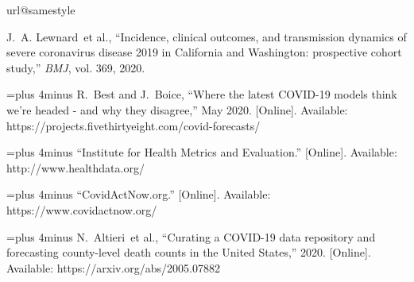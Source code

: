 











% 
% 

\begin{thebibliography}{10}
\providecommand{\url}[1]{#1}
\csname url@samestyle\endcsname
\providecommand{\newblock}{\relax}
\providecommand{\bibinfo}[2]{#2}
\providecommand{\BIBentrySTDinterwordspacing}{\spaceskip=0pt\relax}
\providecommand{\BIBentryALTinterwordstretchfactor}{4}
\providecommand{\BIBentryALTinterwordspacing}{\spaceskip=\fontdimen2\font plus
\BIBentryALTinterwordstretchfactor\fontdimen3\font minus
  \fontdimen4\font\relax}
\providecommand{\BIBforeignlanguage}[2]{{%
\expandafter\ifx\csname l@#1\endcsname\relax
\typeout{** WARNING: IEEEtran.bst: No hyphenation pattern has been}%
\typeout{** loaded for the language `#1'. Using the pattern for}%
\typeout{** the default language instead.}%
\else
\language=\csname l@#1\endcsname
\fi
#2}}
\providecommand{\BIBdecl}{\relax}
\BIBdecl

J.~A. Lewnard~et al., ``{Incidence, clinical outcomes, and transmission
  dynamics of severe coronavirus disease 2019 in California and Washington:
  prospective cohort study},'' \emph{BMJ}, vol. 369, 2020.

\BIBentryALTinterwordspacing
R.~Best and J.~Boice, ``{Where the latest COVID-19 models think we're headed -
  and why they disagree},'' May 2020. [Online]. Available:
  \url{https://projects.fivethirtyeight.com/covid-forecasts/}
\BIBentrySTDinterwordspacing

\BIBentryALTinterwordspacing
``{Institute for Health Metrics and Evaluation}.'' [Online]. Available:
  \url{http://www.healthdata.org/}
\BIBentrySTDinterwordspacing

\BIBentryALTinterwordspacing
``{CovidActNow.org}.'' [Online]. Available: \url{https://www.covidactnow.org/}
\BIBentrySTDinterwordspacing

\BIBentryALTinterwordspacing
N.~Altieri~et al., ``{Curating a COVID-19 data repository and forecasting
  county-level death counts in the United States},'' 2020. [Online]. Available:
  \url{https://arxiv.org/abs/2005.07882}
\BIBentrySTDinterwordspacing


\end{thebibliography}
